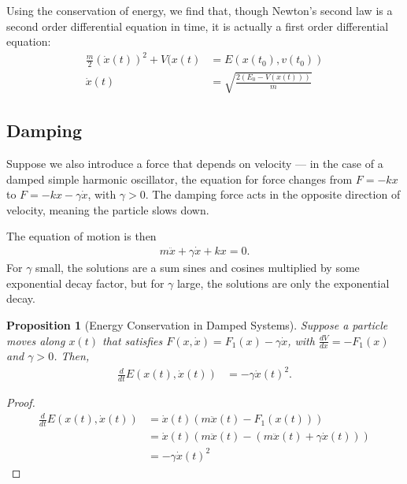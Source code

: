 \documentclass[10pt]{extarticle}
\theoremstyle{plain}
\newtheorem*{proposition}{Proposition}%
\theoremstyle{definition}
\theoremstyle{remark}
\renewcommand{\newline}{\hfill\break}
\begin{document}
  Using the conservation of energy, we find that, though Newton's second law is a second order differential equation in time, it is actually a first order differential equation:
  \begin{align*}
    \frac{m}{2}\left(\dot{x}(t)\right)^2 + V(x(t) &= E(x(t_0),v(t_0))\\
    \dot{x}(t) &= \sqrt{\frac{2(E_0 - V(x(t)))}{m}}
  \end{align*}
  \subsection{Damping}%
  Suppose we also introduce a force that depends on velocity --- in the case of a damped simple harmonic oscillator, the equation for force changes from $F = -kx$ to $F = -kx - \gamma\dot{x}$, with $\gamma > 0$. The damping force acts in the opposite direction of velocity, meaning the particle slows down.\newline

  The equation of motion is then
  \begin{align*}
    m\ddot{x} + \gamma\dot{x} + kx = 0.
  \end{align*}
  For $\gamma$ small, the solutions are a sum sines and cosines multiplied by some exponential decay factor, but for $\gamma$ large, the solutions are only the exponential decay.\newline
  \begin{proposition}[Energy Conservation in Damped Systems]
    Suppose a particle moves along $x(t)$ that satisfies $F(x,\dot{x}) = F_1(x) - \gamma\dot{x}$, with $\frac{dV}{dx} = -F_1(x)$ and $\gamma > 0$. Then,
    \begin{align*}
      \frac{d}{dt}E(x(t),\dot{x}(t)) &= -\gamma\dot{x}(t)^2.
    \end{align*}
  \end{proposition}
  \begin{proof}
      \begin{align*}
        \frac{d}{dt}E(x(t),\dot{x}(t)) &= \dot{x}(t)\left(m\ddot{x}(t) - F_1(x(t))\right)\\
                                       &= \dot{x}(t)\left(m\ddot{x}(t) - (m\ddot{x}(t) + \gamma\dot{x}(t))\right)\\
                                       &= -\gamma\dot{x}(t)^2
      \end{align*}
  \end{proof}
\end{document}
